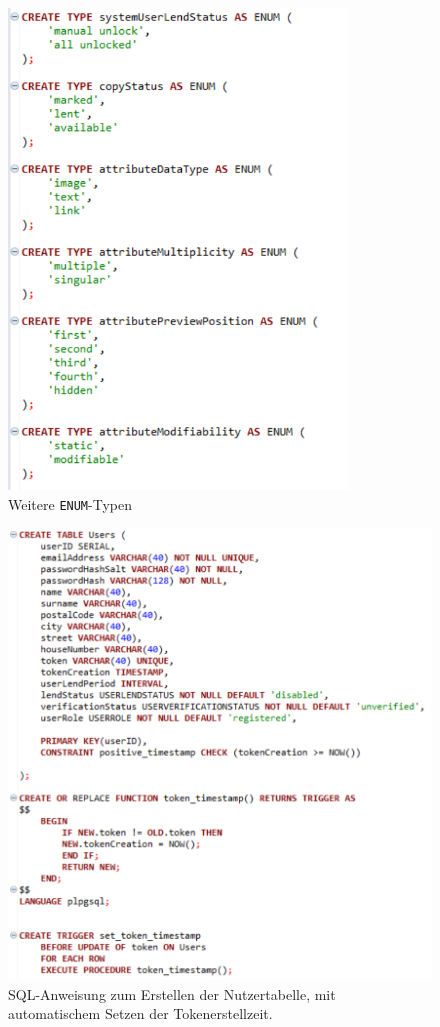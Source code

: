 \documentclass{article}
\begin{document}
\begin{figure}
\centering
\includegraphics[width=9cm]{SQLENUMs2}
\caption{Weitere \texttt{ENUM}-Typen}	
\end{figure}

\begin{figure}
\hypertarget{User}{}
\flushleft
\includegraphics[width=50em]{SQLUSER}
\caption{SQL-Anweisung zum Erstellen der Nutzertabelle, mit automatischem Setzen der Tokenerstellzeit.}
\end{figure}
\end{document}
